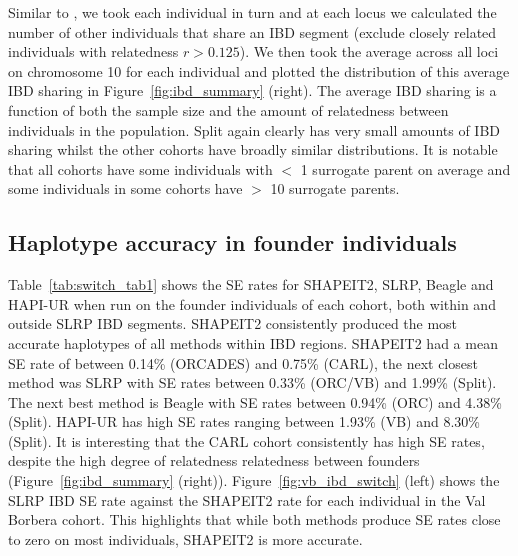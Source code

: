 Similar to \cite{kong2008detection}, we took each individual in turn and at each locus we calculated the number of other individuals that share an IBD segment (exclude closely related individuals with relatedness $r>0.125$). We then took the average across all loci on chromosome 10 for each individual and plotted the distribution of this average IBD sharing in Figure~\ref{fig:ibd_summary} (right). The average IBD sharing is a function of both the sample size and the amount of relatedness between individuals in the population. Split again clearly has very small amounts of IBD sharing whilst the other cohorts have broadly similar distributions. It is notable that all cohorts have some individuals with $<$ 1 surrogate parent on average and some individuals in some cohorts have $>$ 10 surrogate parents. 

\subsection{Haplotype accuracy in founder individuals}
 Table~\ref{tab:switch_tab1} shows the SE rates for SHAPEIT2, SLRP, Beagle and HAPI-UR when run on the founder individuals of each cohort, both within and outside SLRP IBD segments. SHAPEIT2 consistently produced the most accurate haplotypes of all methods within IBD regions. SHAPEIT2 had a mean SE rate of between 0.14\% (ORCADES) and 0.75\% (CARL), the next closest method was SLRP with SE rates between 0.33\% (ORC/VB) and 1.99\% (Split). The next best method is Beagle with SE rates between 0.94\% (ORC) and 4.38\% (Split).  HAPI-UR has high SE rates ranging between 1.93\% (VB) and 8.30\% (Split).  It is interesting that the CARL cohort consistently has high SE rates, despite the high degree of relatedness relatedness between founders (Figure~\ref{fig:ibd_summary} (right)). Figure~\ref{fig:vb_ibd_switch} (left) shows the SLRP IBD SE rate against the SHAPEIT2 rate for each individual in the Val Borbera cohort. This highlights that while both methods produce SE rates close to zero on most individuals, SHAPEIT2 is more accurate. 
 
